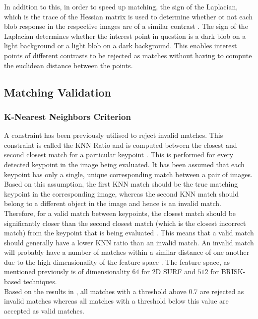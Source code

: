 \documentclass{article}
\begin{document}
In addition to this, in order to speed up matching, the sign of the Laplacian, which is the trace of the Hessian matrix is used to determine whether ot not each blob response in the respective images are of a similar contrast \cite{Bay2008}. The sign of the Laplacian determines whether the interest point in question is a dark blob on a light background or a light blob on a dark background. This enables interest points of different contrasts to be rejected as matches without having to compute the euclidean distance between the points.\\

\subsection{Matching Validation}
\label{sec:validation}

\subsubsection{K-Nearest Neighbors Criterion}
\label{sec:knnMatching}
A constraint has been previously utilised to reject invalid matches. This constraint is called the KNN Ratio and is computed between the closest and second closest match for a particular keypoint \cite{Lowe2004}. This is performed for every detected keypoint in the image being evaluated. It has been assumed that each keypoint has only a single, unique corresponding match between a pair of images. Based on this assumption, the first KNN match should be the true matching keypoint in the corresponding image, whereas the second KNN match should belong to a different object in the image and hence is an invalid match.\\

Therefore, for a valid match between keypoints, the closest match should be significantly closer than the second closest match (which is the closest incorrect match) from the keypoint that is being evaluated \cite{Lowe2004}. This means that a valid match should generally have a lower KNN ratio than an invalid match. An invalid match will probably have a number of matches within a similar distance of one another due to the high dimensionality of the feature space \cite{Lowe2004}. The feature space, as mentioned previously is of dimensionality $64$ for 2D SURF and $512$ for BRISK-based techniques.\\

Based on the results in , all matches with a threshold above $0.7$ are rejected as invalid matches whereas all matches with a threshold below this value are accepted as valid matches.\\
\end{document}
